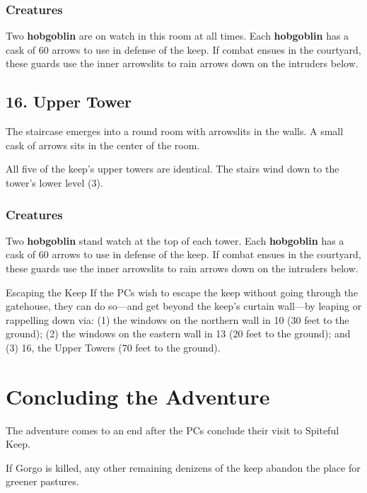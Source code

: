 \documentclass[10pt,a4paper,twoside,bg=print,twocolumn,openany,nodeprecatedcode]{dndbook}
\begin{document}
\subsubsection{Creatures}
Two \textbf{hobgoblin} are on watch in this room at all times. Each \textbf{hobgoblin} has a cask of 60 arrows to use in defense of the keep. If combat ensues in the courtyard, these guards use the inner arrowslits to rain arrows down on the intruders below.

\subsection{16. Upper Tower}
\begin{DndReadAloud}{}
The staircase emerges into a round room with arrowslits in the walls. A small cask of arrows sits in the center of the room.

\end{DndReadAloud}

All five of the keep's upper towers are identical. The stairs wind down to the tower's lower level (3).

\subsubsection{Creatures}
Two \textbf{hobgoblin} stand watch at the top of each tower. Each \textbf{hobgoblin} has a cask of 60 arrows to use in defense of the keep. If combat ensues in the courtyard, these guards use the inner arrowslits to rain arrows down on the intruders below.

\begin{DndSidebar}[float=!b]{Escaping the Keep}
If the PCs wish to escape the keep without going through the gatehouse, they can do so—and get beyond the keep's curtain wall—by leaping or rappelling down via: (1) the windows on the northern wall in 10 (30 feet to the ground); (2) the windows on the eastern wall in 13 (20 feet to the ground); and (3) 16, the Upper Towers (70 feet to the ground).



\end{DndSidebar}

\section{Concluding the Adventure}
The adventure comes to an end after the PCs conclude their visit to Spiteful Keep.

If Gorgo is killed, any other remaining denizens of the keep abandon the place for greener pastures.
\end{document}
